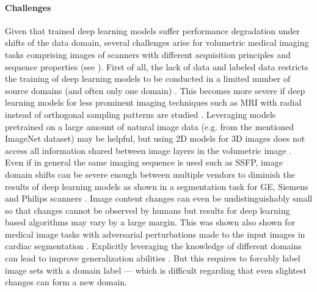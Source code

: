         \paragraph{Challenges} Given that trained deep learning models suffer performance degradation under shifts of the data domain, several challenges arise for volumetric medical imaging tasks comprising images of scanners with different acquisition principles and sequence properties (see ).
        First of all, the lack of data and labeled data restricts the training of deep learning models to be conducted in a limited number of source domains (and often only one domain) \citep{guan2021domain}.
        This becomes more severe if deep learning models for less prominent imaging techniques such as \ac{MRI} with radial instead of orthogonal sampling patterns are studied \citep{han2018deep}.
        Leveraging models pretrained on a large amount of natural image data (e.g. from the mentioned ImageNet dataset) may be helpful, but using \ac{2D} models for \ac{3D} images does not access all information shared between image layers in the volumetric image \citep{guan2021domain}.
        Even if in general the same imaging sequence is used such as \ac{SSFP}, image domain shifts can be severe enough between multiple vendors to diminish the results of deep learning models as shown in a segmentation task for GE, Siemens and Philips scanners \citep{yan2019edge}.
        Image content changes can even be undistinguishably small so that changes cannot be observed by humans but results for deep learning based algorithms may vary by a large margin. This was shown also shown for medical image tasks with adversarial perturbations made to the input images in cardiac segmentation \citep{yan2019domain}.
        Explicitly leveraging the knowledge of different domains can lead to improve generalization abilities \citep{ganin2016domain}. But this requires to forcably label image sets with a domain label --- which is difficult regarding that even slightest changes can form a new domain.

